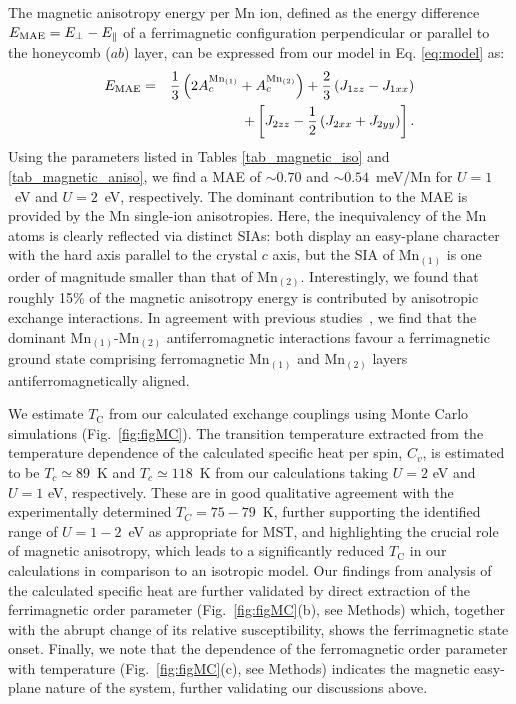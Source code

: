 \documentclass[preprint,amsmath,amssymb,aps,nofootinbib,superscriptaddress]{revtex4-2}
\begin{document}
The magnetic anisotropy energy per Mn ion, defined as the energy difference $E_{\mbox{\scriptsize MAE}}=E_\perp-E_\parallel$ of a ferrimagnetic configuration perpendicular or parallel to the honeycomb ($ab$) layer, can be expressed from our model in Eq. \ref{eq:model} as:
\begin{eqnarray}
E_{\mbox{\scriptsize MAE}}&=&\frac{1}{3}\left(2A_c^{\mbox{\scriptsize Mn$_{(1)}$}}+A_c^{\mbox{\scriptsize Mn$_{(2)}$}}\right)+\frac{2}{3}\left(J_{1zz}-J_{1xx}\right)\nonumber\\
&&+\left[J_{2zz}-\frac{1}{2}\left(J_{2xx}+J_{2yy}\right) \right].
\end{eqnarray}
Using the parameters listed in Tables \ref{tab_magnetic_iso} and \ref{tab_magnetic_aniso}, we find a MAE of $\sim 0.70$ and $\sim 0.54$~meV/Mn for $U=1$~eV and $U=2$~eV, respectively. The dominant contribution to the MAE is provided by the Mn single-ion anisotropies. Here, the inequivalency of the Mn atoms is clearly reflected via distinct SIAs: both display an easy-plane character with the hard axis parallel to the crystal $c$ axis, but the SIA of Mn$_{(1)}$ is one order of magnitude smaller than that of Mn$_{(2)}$. Interestingly, we found that roughly 15\% of the magnetic anisotropy energy is contributed by anisotropic exchange interactions. In agreement with previous studies~\cite{PRB2017May,Nature2021Seo}, we find that the dominant Mn$_{(1)}$-Mn$_{(2)}$ antiferromagnetic interactions favour a ferrimagnetic ground state comprising ferromagnetic Mn$_{(1)}$ and Mn$_{(2)}$ layers antiferromagnetically aligned. 

We estimate $T_\mathrm{C}$ from our calculated exchange couplings using Monte Carlo simulations (Fig.~\ref{fig:figMC}). The transition temperature extracted from the temperature dependence of the calculated specific heat per spin, $C_v$, is estimated to be $T_c\simeq 89$~K  and $T_c\simeq 118$~K from our calculations taking $U=2$ eV and $U=1$ eV, respectively. These are in good qualitative agreement with the experimentally determined $T_C=75-79$~K, further supporting the identified range of $U=1-2$~eV as appropriate for MST, and highlighting the crucial role of magnetic anisotropy, which leads to a significantly reduced $T_\mathrm{C}$ in our calculations in comparison to an isotropic model. Our findings from analysis of the calculated specific heat are further validated by direct extraction of the ferrimagnetic order parameter (Fig.~\ref{fig:figMC}(b), see Methods) which, together with the abrupt change of its relative susceptibility, shows the ferrimagnetic state onset. Finally, we note that the dependence of the ferromagnetic order parameter with temperature (Fig.~\ref{fig:figMC}(c), see Methods) indicates the magnetic easy-plane nature of the system, further validating our discussions above.
\end{document}
